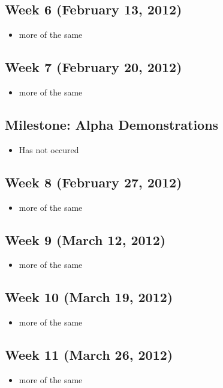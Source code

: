 \documentclass[11pt,a4paper,oneside]{article}
\begin{document}
\subsection{Week 6 (February 13, 2012)}
\begin{itemize}
\item more of the same
\end{itemize}

\subsection{Week 7 (February 20, 2012)}
\begin{itemize}
\item more of the same
\end{itemize}

\subsection{Milestone: Alpha Demonstrations}
\begin{itemize}
\item Has not occured
\end{itemize}

\subsection{Week 8 (February 27, 2012)}
\begin{itemize}
\item more of the same
\end{itemize}

\subsection{Week 9 (March 12, 2012)}
\begin{itemize}
\item more of the same
\end{itemize}

\subsection{Week 10 (March 19, 2012)}
\begin{itemize}
\item more of the same
\end{itemize}

\subsection{Week 11 (March 26, 2012)}
\begin{itemize}
\item more of the same
\end{itemize}
\end{document}
